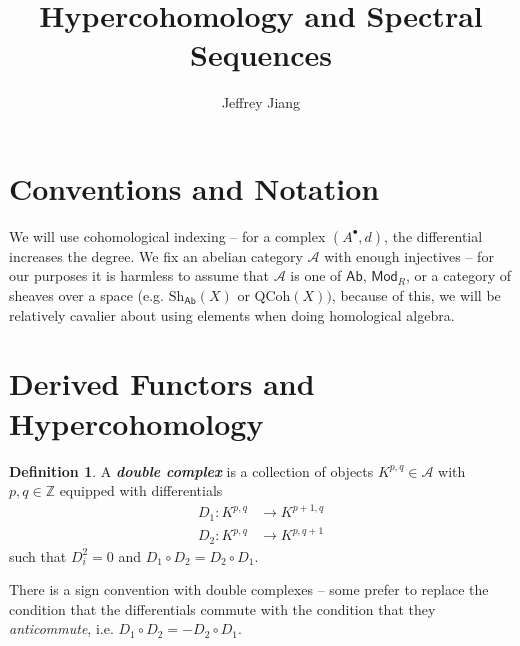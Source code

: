 \documentclass[psamsfonts, 12pt]{amsart}
\theoremstyle{definition}
\newtheorem{defn}[thm]{Definition}
\theoremstyle{remark}
\newcommand{\ib}[1]{\textbf{\textit{#1}}}
\newcommand{\Z}{\mathbb{Z}}
\begin{document}
%
\author{Jeffrey Jiang}
%
\title{Hypercohomology and Spectral Sequences}
%
\maketitle
%
\tableofcontents
%
\section*{Conventions and Notation}
%
We will use cohomological indexing -- for a complex $(A^\bullet, d)$, the differential
increases the degree. We fix an abelian category $\mathcal{A}$ with enough
injectives -- for our purposes it is harmless to assume that $\mathcal{A}$ is
one of $\mathsf{Ab}$, $\mathsf{Mod}_R$, or a category of sheaves over a space
(e.g. $\mathrm{Sh}_{\mathsf{Ab}}(X)$ or $\mathrm{QCoh}(X))$, because of this,
we will be relatively cavalier about using elements when doing homological algebra.
%
\section{Derived Functors and Hypercohomology}
%
\begin{defn}
A \ib{double complex} is a collection of objects $K^{p,q} \in \mathcal{A}$ with
$p,q \in \Z$ equipped with differentials
\begin{align*}
D_1 : K^{p,q} &\to K^{p+1,q} \\
D_2 : K^{p,q} &\to K^{p,q+1}
\end{align*}
such that $D_i^2 = 0$ and $D_1 \circ D_2 = D_2 \circ D_1$.
\end{defn}
%
There is a sign convention with double complexes -- some prefer to replace
the condition that the differentials commute with the condition that they
\emph{anticommute}, i.e. $D_1 \circ D_2 = -D_2\circ D_1$. \\
\end{document}
